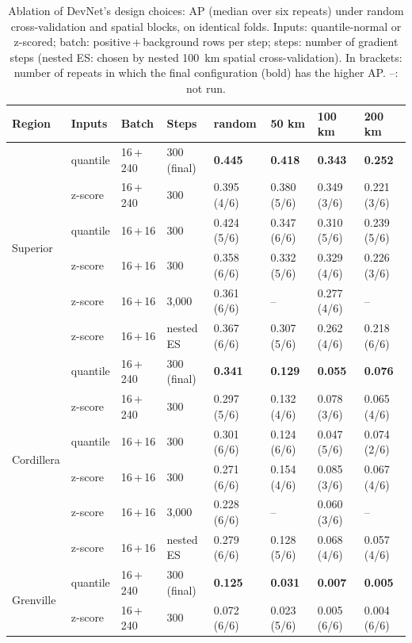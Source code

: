 \documentclass[pdflatex,sn-apa]{sn-jnl}
\begin{document}
\begin{appendices}
\begin{table}[!h]
\caption{Ablation of DevNet's design choices: AP (median over six repeats) under random cross-validation and spatial blocks, on identical folds. Inputs: quantile-normal or z-scored; batch: positive\,+\,background rows per step; steps: number of gradient steps (nested ES: chosen by nested 100~km spatial cross-validation). In brackets: number of repeats in which the final configuration (bold) has the higher AP. --: not run.}\label{tab:ablation}
\scriptsize
\setlength{\tabcolsep}{2.5pt}
\begin{tabular*}{\textwidth}{@{\extracolsep\fill}llllllll}
\toprule
Region & Inputs & Batch & Steps & random & 50 km & 100 km & 200 km \\
\midrule
\multirow{6}{*}{Superior} & quantile & 16\,+\,240 & 300 (final) & \textbf{0.445} & \textbf{0.418} & \textbf{0.343} & \textbf{0.252} \\
 & z-score & 16\,+\,240 & 300 & 0.395 (4/6) & 0.380 (5/6) & 0.349 (3/6) & 0.221 (3/6) \\
 & quantile & 16\,+\,16 & 300 & 0.424 (5/6) & 0.347 (6/6) & 0.310 (5/6) & 0.239 (5/6) \\
 & z-score & 16\,+\,16 & 300 & 0.358 (6/6) & 0.332 (5/6) & 0.329 (4/6) & 0.226 (3/6) \\
 & z-score & 16\,+\,16 & 3,000 & 0.361 (6/6) & -- & 0.277 (4/6) & -- \\
 & z-score & 16\,+\,16 & nested ES & 0.367 (6/6) & 0.307 (5/6) & 0.262 (4/6) & 0.218 (6/6) \\
\midrule
\multirow{6}{*}{Cordillera} & quantile & 16\,+\,240 & 300 (final) & \textbf{0.341} & \textbf{0.129} & \textbf{0.055} & \textbf{0.076} \\
 & z-score & 16\,+\,240 & 300 & 0.297 (5/6) & 0.132 (4/6) & 0.078 (3/6) & 0.065 (4/6) \\
 & quantile & 16\,+\,16 & 300 & 0.301 (6/6) & 0.124 (6/6) & 0.047 (5/6) & 0.074 (2/6) \\
 & z-score & 16\,+\,16 & 300 & 0.271 (6/6) & 0.154 (4/6) & 0.085 (3/6) & 0.067 (4/6) \\
 & z-score & 16\,+\,16 & 3,000 & 0.228 (6/6) & -- & 0.060 (3/6) & -- \\
 & z-score & 16\,+\,16 & nested ES & 0.279 (6/6) & 0.128 (5/6) & 0.068 (4/6) & 0.057 (4/6) \\
\midrule
\multirow{6}{*}{Grenville} & quantile & 16\,+\,240 & 300 (final) & \textbf{0.125} & \textbf{0.031} & \textbf{0.007} & \textbf{0.005} \\
 & z-score & 16\,+\,240 & 300 & 0.072 (6/6) & 0.023 (5/6) & 0.005 (6/6) & 0.004 (6/6) \\

\end{tabular*}
\end{table}
\end{appendices}
\end{document}
